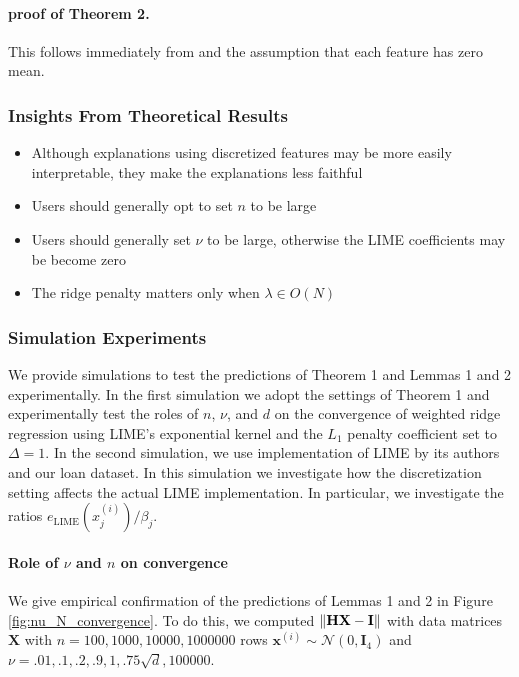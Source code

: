 \documentclass[mnsc,blindrev]{informs3}
\begin{document}
            
        \paragraph{proof of Theorem 2.}
            This follows immediately from \citep{StrumbeljErik2014Epma} and the assumption that each feature has zero mean.
    
            
        \subsubsection{Insights From Theoretical Results}
            \begin{itemize}
                \item Although explanations using discretized features may be more easily interpretable, they make the explanations less faithful
                \item Users should generally opt to set $n$ to be large 
                \item Users should generally set $\nu$ to be large, otherwise the LIME coefficients may be become zero
                \item The ridge penalty matters only when $\lambda \in O(N)$
            \end{itemize}
    
            \subsubsection{Simulation Experiments}
                \label{sec:simulation_experiments}
                We provide simulations to test the predictions of Theorem 1 and Lemmas 1 and 2 experimentally. In the first simulation we adopt the settings of Theorem 1 and experimentally test the roles of $n$, $\nu$, and $d$ on the convergence of weighted ridge regression using LIME's exponential kernel and the $L_1$ penalty coefficient set to $\Delta=1$. In the second simulation, we use implementation of LIME by its authors and our loan dataset. In this simulation we investigate how the discretization setting affects the actual LIME implementation. In particular, we investigate the ratios $e_{\text{LIME}}(x^{(i)}_j)/\beta_j$. 
    

    
                \paragraph{Role of $\nu$ and $n$ on convergence}
                    We give empirical confirmation of the predictions of Lemmas 1 and 2 in Figure \ref{fig:nu_N_convergence}. To do this, we computed $\norm{\mathbf{H}\mathbf{X} - \mathbf{I}}$ with data matrices $\mathbf{X}$ with $n=100,1000,10000,1000000$ rows  $\mathbf{x}^{(i)} \sim \mathcal{N}(0,\mathbf{I}_4)$ and $\nu=.01,.1,.2,.9,1,.75\sqrt{d},100000$. 
    
\end{document}
